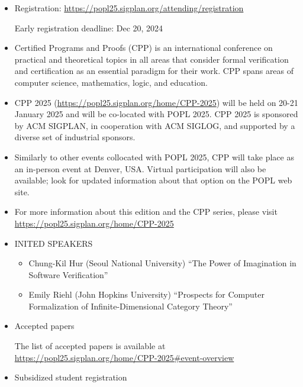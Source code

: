 \documentclass[prodmode,acmtecs]{acmsmall} %
\begin{document}
\begin{itemize}\item  Registration: \href{https://popl25.sigplan.org/attending/registration}{https://popl25.sigplan.org/attending/registration} 
 
Early registration deadline: Dec 20, 2024 
 
\item  Certified Programs and Proofs (CPP) is an international conference on practical and theoretical topics in all areas that consider formal verification and certification as an essential paradigm for their work. CPP spans areas of computer science, mathematics, logic, and education.  
 
\item  CPP 2025 (\href{https://popl25.sigplan.org/home/CPP-2025}{https://popl25.sigplan.org/home/CPP-2025}) will be held on 20-21 January 2025 and will be co-located with POPL 2025. CPP 2025 is sponsored by ACM SIGPLAN, in cooperation with ACM SIGLOG, and supported by a diverse set of industrial sponsors. 
 
\item  Similarly to other events collocated with POPL 2025, CPP will take place as an in-person event at Denver, USA. Virtual participation will also be available; look for updated information about that option on the POPL web site.  
 
\item  For more information about this edition and the CPP series, please visit \href{https://popl25.sigplan.org/home/CPP-2025}{https://popl25.sigplan.org/home/CPP-2025} 
 
\item  INITED SPEAKERS 
 
\begin{itemize}\item  Chung-Kil Hur (Seoul National University) ``The Power of Imagination in Software Verification''
\item  Emily Riehl (John Hopkins University) ``Prospects for Computer Formalization of Infinite-Dimensional Category Theory''
\end{itemize} 
\item  Accepted papers 
 
  The list of accepted papers is available at \href{https://popl25.sigplan.org/home/CPP-2025#event-overview}{https://popl25.sigplan.org/home/CPP-2025\#event-overview} 
 
\item  Subsidized student registration 
 

\end{itemize}
\end{document}
